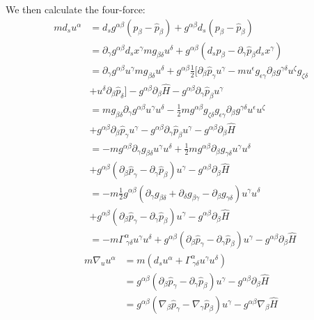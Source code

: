 \documentclass[aps,pra,10pt,twocolumn,floatfix,nofootinbib]{revtex4-1}
\theoremstyle{definition}
\begin{document}
We then calculate the four-force:
\begin{align*}
m d_s u^\alpha &= d_s g^{\alpha\beta}(p_\beta-\hat{p}_\beta) + g^{\alpha\beta} d_s (p_\beta-\hat{p}_\beta) \\
&= \partial_\gamma g^{\alpha\beta} d_s x^\gamma m g_{\beta \delta} u^\delta + g^{\alpha\beta} (d_s p_\beta - \partial_\gamma \hat{p}_\beta d_s x^\gamma) \\
&= \partial_\gamma g^{\alpha\beta} u^\gamma m g_{\beta \delta} u^\delta + g^{\alpha\beta} \frac{1}{2} [\partial_\beta \hat{p}_\gamma u^\gamma
- m u^\epsilon g_{\epsilon\gamma} \partial_\beta g^{\gamma \delta} u^\zeta g_{\zeta\delta} \\
&+ u^\delta \partial_\beta \hat{p}_\delta ]- g^{\alpha\beta} \partial_\beta \hat{H} - g^{\alpha\beta} \partial_\gamma \hat{p}_\beta u^\gamma \\
&= m  g_{\beta \delta} \partial_\gamma g^{\alpha\beta} u^\gamma u^\delta - \frac{1}{2} m g^{\alpha\beta} g_{\zeta\delta} g_{\epsilon\gamma} \partial_\beta g^{\gamma \delta} u^\epsilon u^\zeta  \\
&+ g^{\alpha\beta} \partial_\beta \hat{p}_\gamma u^\gamma - g^{\alpha\beta} \partial_\gamma \hat{p}_\beta u^\gamma
- g^{\alpha\beta} \partial_\beta \hat{H}\\
&= - m  g^{\alpha \beta} \partial_\gamma g_{\beta\delta} u^\gamma u^\delta + \frac{1}{2} m g^{\alpha\beta} \partial_\beta g_{\gamma \delta} u^\gamma u^\delta  \\
&+ g^{\alpha\beta} (\partial_\beta \hat{p}_\gamma - \partial_\gamma \hat{p}_\beta ) u^\gamma
- g^{\alpha\beta} \partial_\beta \hat{H}\\
&= - m \frac{1}{2} g^{\alpha \beta} ( \partial_\gamma g_{\beta\delta} + \partial_\delta g_{\beta\gamma} - \partial_\beta g_{\gamma \delta} ) u^\gamma u^\delta  \\
&+ g^{\alpha\beta} (\partial_\beta \hat{p}_\gamma - \partial_\gamma \hat{p}_\beta ) u^\gamma
- g^{\alpha\beta} \partial_\beta \hat{H}\\
&= - m \Gamma ^\alpha_{\ \gamma \delta} u^\gamma u^\delta + g^{\alpha\beta} (\partial_\beta \hat{p}_\gamma - \partial_\gamma \hat{p}_\beta ) u^\gamma
- g^{\alpha\beta} \partial_\beta \hat{H}
\end{align*}
\begin{align*}
m \nabla_{u} u^\alpha &= m (d_s u^\alpha + \Gamma ^\alpha_{\ \gamma \delta} u^\gamma u^\delta)  \\
&= g^{\alpha\beta} (\partial_\beta \hat{p}_\gamma - \partial_\gamma \hat{p}_\beta ) u^\gamma - g^{\alpha\beta} \partial_\beta \hat{H}\\
&= g^{\alpha\beta} (\nabla_\beta \hat{p}_\gamma - \nabla_\gamma \hat{p}_\beta ) u^\gamma - g^{\alpha\beta} \nabla_\beta \hat{H}
\end{align*}
\end{document}
